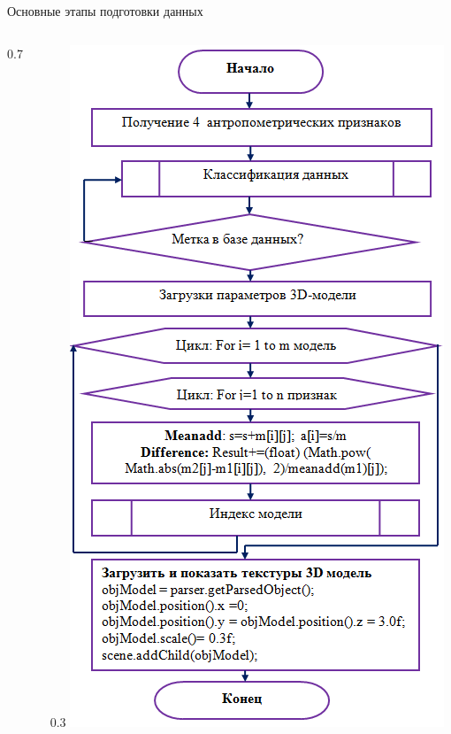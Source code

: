 \documentclass[10pt,pdf,hyperref={unicode},xcolor=table]{beamer}
\begin{document}
\begin{frame}{Основные этапы подготовки данных}
\begin{columns}
\begin{column} {0.7\textwidth}
			\end{column}
			\begin{column} {0.3\textwidth}
		\includegraphics[width=1\linewidth]{p13}
			\end{column}      
		\end{columns}
\end{frame}
\end{document}
